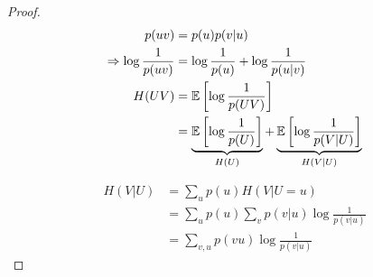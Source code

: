 \begin{proof}
    \[
        \begin{aligned}
           p(uv) &= p(u) p(v\vert u)\\
           \Rightarrow \log \frac{1}{p(uv)} &= \log \frac{1}{p(u)} + \log \frac{1}{p(u\vert v)}\\
           H(UV) &= \mathbb{E}\left[ \log \frac{1}{p(UV)} \right]\\
           &= \underbrace{\mathbb{E}\left[ \log\frac{1}{p(U)} \right]}_{H(U)} + \underbrace{\mathbb{E}\left[ \log\frac{1}{p(V\vert U)} \right]}_{H(V\vert U)}
        \end{aligned}            
    \]

    \[
        \begin{aligned}
            H(V\vert U) &= \sum_u p(u) H(V\vert U=u)\\
            &= \sum_u p(u) \sum_v p(v\vert u) \log \frac{1}{p(v\vert u)}\\
            &= \sum_{v,u} p(vu) \log \frac{1}{p(v\vert u)}
        \end{aligned}
    \]
\end{proof}